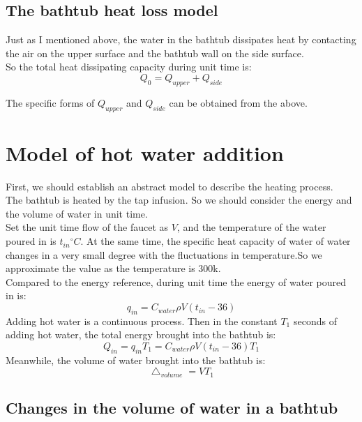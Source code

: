 \documentclass{mcmthesis}
\begin{document}
\subsection{The bathtub heat loss model} 	%

\indent Just as I mentioned above, the water in the bathtub dissipates heat by contacting the air on the upper surface and the bathtub wall on the side surface. \\

\indent So the total heat dissipating capacity during unit time is:
\begin{equation}
	Q_{0}=Q_{upper}+Q_{side}
\end{equation}


\indent The specific forms of $Q_{upper}$ and $Q_{side}$ can be obtained from the above. 

\section{Model of hot water addition}
\indent First, we should establish an abstract model to describe the heating process.\\
\indent The bathtub is heated by the tap infusion. So we should consider the energy and the volume of water in unit time. \\\indent Set the unit time flow of the faucet as $ V $, and the temperature of the water poured in is $ t_{in} {^\circ}C$. At the same time, the specific heat capacity of water of water changes in a very small degree with the fluctuations in temperature.So we approximate the value as the temperature is 300k. \\
\indent Compared to the energy reference, during unit time the energy of water poured in is:
\begin{equation}
	q_{in}=C_{water}\rho V(t_{in}-36) 
\end{equation}
\indent Adding hot water is a continuous process. Then in the constant $ T_{1} $ seconds of adding hot water, the total energy brought into the bathtub is:
\begin{equation}
	Q_{in}=q_{in}T_{1}=C_{water}\rho V(t_{in}-36)T_{1}
\end{equation}
\indent Meanwhile, the volume of water brought into the bathtub is:
\begin{equation}
	\bigtriangleup_{volume}=VT_{1} 
\end{equation}
\subsection{Changes in the volume of water in a bathtub}
\end{document}
